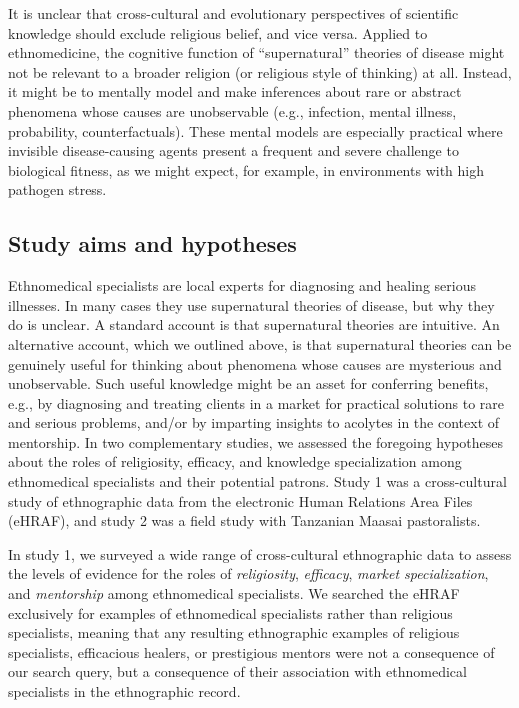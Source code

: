 \documentclass[
  11pt,
]{article}
\begin{document}
It is unclear that cross-cultural and evolutionary perspectives of scientific knowledge should exclude religious belief, and vice versa. Applied to ethnomedicine, the cognitive function of ``supernatural'' theories of disease might not be relevant to a broader religion (or religious style of thinking) at all. Instead, it might be to mentally model and make inferences about rare or abstract phenomena whose causes are unobservable (e.g., infection, mental illness, probability, counterfactuals). These mental models are especially practical where invisible disease-causing agents present a frequent and severe challenge to biological fitness, as we might expect, for example, in environments with high pathogen stress.

\hypertarget{study-aims-and-hypotheses}{%
\subsection{Study aims and hypotheses}\label{study-aims-and-hypotheses}}

Ethnomedical specialists are local experts for diagnosing and healing serious illnesses. In many cases they use supernatural theories of disease, but why they do is unclear. A standard account is that supernatural theories are intuitive. An alternative account, which we outlined above, is that supernatural theories can be genuinely useful for thinking about phenomena whose causes are mysterious and unobservable. Such useful knowledge might be an asset for conferring benefits, e.g., by diagnosing and treating clients in a market for practical solutions to rare and serious problems, and/or by imparting insights to acolytes in the context of mentorship.
In two complementary studies, we assessed the foregoing hypotheses about the roles of religiosity, efficacy, and knowledge specialization among ethnomedical specialists and their potential patrons. Study 1 was a cross-cultural study of ethnographic data from the electronic Human Relations Area Files (eHRAF), and study 2 was a field study with Tanzanian Maasai pastoralists.

In study 1, we surveyed a wide range of cross-cultural ethnographic data to assess the levels of evidence for the roles of \emph{religiosity}, \emph{efficacy}, \emph{market specialization}, and \emph{mentorship} among ethnomedical specialists. We searched the eHRAF exclusively for examples of ethnomedical specialists rather than religious specialists, meaning that any resulting ethnographic examples of religious specialists, efficacious healers, or prestigious mentors were not a consequence of our search query, but a consequence of their association with ethnomedical specialists in the ethnographic record.
\end{document}
